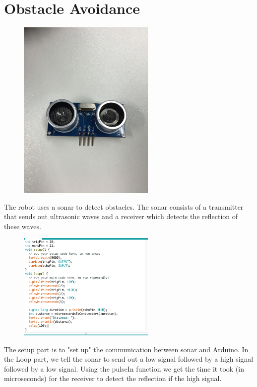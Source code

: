 \documentclass[final,3p,times]{article}
\begin{document}
\section{Obstacle Avoidance}
\begin{figure}[h]
\includegraphics[trim={14cm 30cm 14cm 50cm}, clip, width=2.6in]{./media/Sonar.jpg}
\end{figure}
The robot uses a sonar to detect obstacles. 
The sonar consists of a transmitter that sends out ultrasonic waves and a receiver which detects the reflection of these waves.
\newpage
\begin{figure}
\includegraphics[trim={0cm 0cm 0cm 0cm}, clip, width=2.6in]{./media/sonarCode.jpg}
\end{figure}%
The setup part is to "set up" the communication between sonar and Arduino.
In the Loop part, we tell the sonar to send out a low signal followed by a high signal followed by a low signal.
Using the pulseIn function we get the time it took (in microseconds) for the receiver to detect the reflection if the high signal.\\ \\ \\ \\ \\ \\ \\
\end{document}
